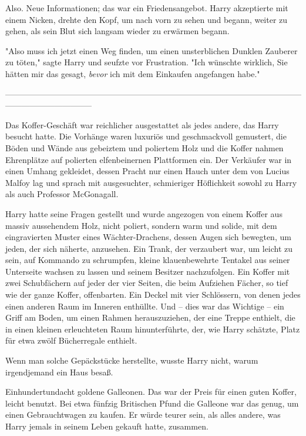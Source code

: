 {Also. Neue Informationen; das war ein Friedensangebot. Harry akzeptierte mit einem Nicken, drehte den Kopf, um nach vorn zu sehen und begann, weiter zu gehen, als sein Blut sich langsam wieder zu erwärmen begann.

"Also muss ich jetzt einen Weg finden, um einen unsterblichen Dunklen Zauberer zu töten," sagte Harry und seufzte vor Frustration. "Ich wünschte wirklich, Sie hätten mir das gesagt, \emph{bevor} ich mit dem Einkaufen angefangen habe."

--------------------------------------------------------------------------------------------------------------------------------------------

Das Koffer-Geschäft war reichlicher ausgestattet als jedes andere, das Harry besucht hatte. Die Vorhänge waren luxuriös und geschmackvoll gemustert, die Böden und Wände aus gebeiztem und poliertem Holz und die Koffer nahmen Ehrenplätze auf polierten elfenbeinernen Plattformen ein. Der Verkäufer war in einen Umhang gekleidet, dessen Pracht nur einen Hauch unter dem von Lucius Malfoy lag und sprach mit ausgesuchter, schmieriger Höflichkeit sowohl zu Harry als auch Professor McGonagall.

Harry hatte seine Fragen gestellt und wurde angezogen von einem Koffer aus massiv aussehendem Holz, nicht poliert, sondern warm und solide, mit dem eingravierten Muster eines Wächter-Drachens, dessen Augen sich bewegten, um jeden, der sich näherte, anzusehen. Ein Trank, der verzaubert war, um leicht zu sein, auf Kommando zu schrumpfen, kleine klauenbewehrte Tentakel aus seiner Unterseite wachsen zu lassen und seinem Besitzer nachzufolgen. Ein Koffer mit zwei Schubfächern auf jeder der vier Seiten, die beim Aufziehen Fächer, so tief wie der ganze Koffer, offenbarten. Ein Deckel mit vier Schlössern, von denen jedes einen anderen Raum im Inneren enthüllte. Und -- dies war das Wichtige -- ein Griff am Boden, um einen Rahmen herauszuziehen, der eine Treppe enthielt, die in einen kleinen erleuchteten Raum hinunterführte, der, wie Harry schätzte, Platz für etwa zwölf Bücherregale enthielt.

Wenn man solche Gepäckstücke herstellte, wusste Harry nicht, warum irgendjemand ein Haus besaß.

Einhundertundacht goldene Galleonen. Das war der Preis für einen guten Koffer, leicht benutzt. Bei etwa fünfzig Britischen Pfund die Galleone war das genug, um einen Gebrauchtwagen zu kaufen. Er würde teurer sein, als alles andere, was Harry jemals in seinem Leben gekauft hatte, zusammen.

}
